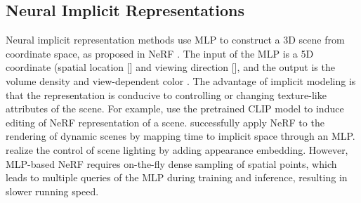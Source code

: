 \documentclass[letterpaper]{article} \usepackage{aaai23}  \usepackage{times}  \usepackage{helvet}  \usepackage{courier}  \usepackage[hyphens]{url}  \usepackage{graphicx} \urlstyle{rm} \def\UrlFont{\rm}  \usepackage{natbib}  \usepackage{caption} \frenchspacing  \setlength{\pdfpagewidth}{8.5in}  \setlength{\pdfpageheight}{11in}  \usepackage{multirow}
\begin{document}
\subsection{Neural Implicit Representations} 
Neural implicit representation methods use MLP to construct a 3D scene from coordinate space, as proposed in NeRF \cite{mildenhall2020NeRF}. The input of the MLP is a 5D coordinate (spatial location [] and viewing direction [], and the output is the volume density and view-dependent color \cite{mildenhall2019llff, sitzmann2019svn, lombardi2019nv, bi2020deep}. The advantage of implicit modeling is that the representation is conducive to controlling or changing texture-like attributes of the scene. For example, \citeauthor{kobayashi2022decomposingEditing} use the pretrained CLIP model \cite{radford2021clip} to induce editing of NeRF representation of a scene. \citeauthor{pumarola2021dNeRF} successfully apply NeRF to the rendering of dynamic scenes by mapping time  to implicit space through an MLP. \citeauthor{martin2021NeRFinthewild} realize the control of scene lighting by adding appearance embedding. However, MLP-based NeRF requires on-the-fly dense sampling of spatial points, which leads to multiple queries of the MLP during training and inference, resulting in slower running speed.
\end{document}
